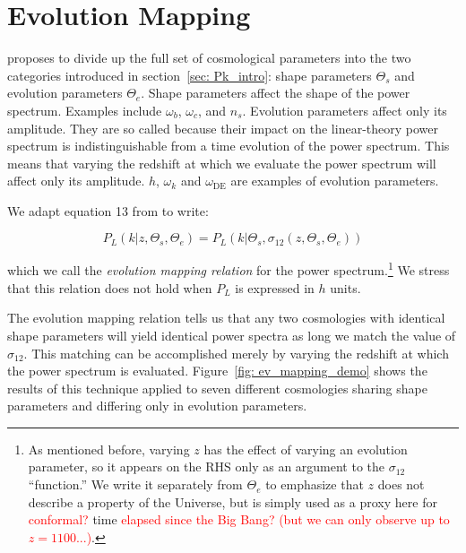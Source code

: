 \section{Evolution Mapping}
\label{sec: ev_mapping_intro}

\citet{San21} proposes to divide up the full set of cosmological
parameters into the two categories introduced in section~\ref{sec: Pk_intro}: 
shape parameters $\Theta_s$ and evolution parameters $\Theta_e$.
Shape parameters affect the shape of the power spectrum. Examples include
$\omega_b$, $\omega_c$, and $n_s$.
Evolution parameters affect only its amplitude. They are so called because
their impact on the linear-theory power spectrum is 
indistinguishable from a time evolution of the power 
spectrum. This means that varying the redshift at which we evaluate the power
spectrum will affect only its amplitude. $h$, $\omega_k$ and
$\omega_\text{DE}$ are examples of evolution parameters. 

We adapt equation 13 from \citet{San21} to write:

\begin{equation}
\label{eq: evMapping_pSpectrum}
    P_L (k | z, \Theta_s, \Theta_e)
    =
    P_L (k | \Theta_s, \sigma_{12} \left( z, \Theta_s, \Theta_e \right))
\end{equation}

which we call the \textit{evolution mapping relation} for the power
spectrum.\footnote{As mentioned before, varying $z$ has the effect of varying 
an evolution parameter, so it appears on the RHS only as an argument 
to the $\sigma_{12}$ ``function.'' We write it separately from $\Theta_e$ to
emphasize that $z$ does not describe a property of the Universe, but is
simply used as a proxy here for \textcolor{red}{conformal?} time
\textcolor{red}{elapsed since the Big Bang? (but we can only observe up to
$z = 1100$...)}.} We stress that this relation does not hold when $P_L$ is
expressed in $h$ units.


The evolution mapping relation tells us that any two cosmologies with 
identical shape
parameters will yield identical power spectra as long we match the value of
$\sigma_{12}$. This matching can be accomplished merely by varying the 
redshift at which the power spectrum is evaluated.
Figure~\ref{fig: ev_mapping_demo} shows the results of this technique applied
to seven different cosmologies sharing shape parameters and differing only
in evolution parameters.

